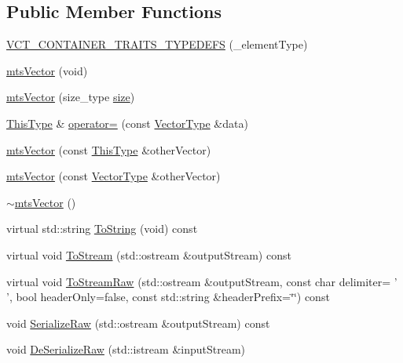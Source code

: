 \subsection*{Public Member Functions}
\begin{DoxyCompactItemize}
\item 
\hyperlink{classmts_vector_a1a58641b9a6be36ef053853a4f17b2be}{V\-C\-T\-\_\-\-C\-O\-N\-T\-A\-I\-N\-E\-R\-\_\-\-T\-R\-A\-I\-T\-S\-\_\-\-T\-Y\-P\-E\-D\-E\-F\-S} (\-\_\-element\-Type)
\item 
\hyperlink{classmts_vector_a87a79f0e97df96765fa393b08c23817c}{mts\-Vector} (void)
\item 
\hyperlink{classmts_vector_a2316fe5ddd0c535f306c115cf84fe08f}{mts\-Vector} (size\-\_\-type \hyperlink{classvct_dynamic_const_vector_base_a79950d8cced7fd4e790d9ac2ca1c43a7}{size})
\item 
\hyperlink{classvct_dynamic_const_vector_base_a39da273523717f678f54d3321ebca3dd}{This\-Type} \& \hyperlink{classmts_vector_a66509e4463a281ecfe252236872d2835}{operator=} (const \hyperlink{classmts_vector_a49432bef14e2c0e3d4d9786d4e1093c7}{Vector\-Type} \&data)
\item 
\hyperlink{classmts_vector_ac0b3eaab70c823b6c1402b2ec3941f53}{mts\-Vector} (const \hyperlink{classvct_dynamic_const_vector_base_a39da273523717f678f54d3321ebca3dd}{This\-Type} \&other\-Vector)
\item 
\hyperlink{classmts_vector_a3dd3d96f8241bf032dfeafd7f939fd86}{mts\-Vector} (const \hyperlink{classmts_vector_a49432bef14e2c0e3d4d9786d4e1093c7}{Vector\-Type} \&other\-Vector)
\item 
\hyperlink{classmts_vector_a3c2d2ded1f98025ef7e4a39b500431fc}{$\sim$mts\-Vector} ()
\item 
virtual std\-::string \hyperlink{classmts_vector_ae5e936e57683f889249d877790b7dd22}{To\-String} (void) const 
\item 
virtual void \hyperlink{classmts_vector_a38a18c371b6e20b7fd4534e42d2cfe59}{To\-Stream} (std\-::ostream \&output\-Stream) const 
\item 
virtual void \hyperlink{classmts_vector_a4893fa7e69f3b9307cdb96f937852151}{To\-Stream\-Raw} (std\-::ostream \&output\-Stream, const char delimiter= ' ', bool header\-Only=false, const std\-::string \&header\-Prefix=\char`\"{}\char`\"{}) const 
\item 
void \hyperlink{classmts_vector_a4e794f0bba29de4e6f09009f167d2916}{Serialize\-Raw} (std\-::ostream \&output\-Stream) const 
\item 
void \hyperlink{classmts_vector_aed1e6de9cc166814be483f3bfb468724}{De\-Serialize\-Raw} (std\-::istream \&input\-Stream)
\end{DoxyCompactItemize}
